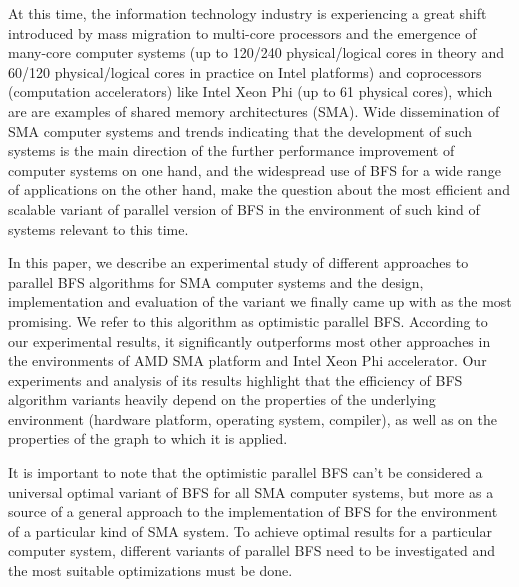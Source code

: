 \documentclass[letterpaper]{article}
\begin{document}
		At this time, the information technology industry is experiencing a great shift introduced by mass migration to multi-core processors and the emergence of many-core computer systems (up to 120/240 physical/logical cores in theory and 60/120 physical/logical cores in practice on Intel platforms) and coprocessors (computation accelerators) like Intel Xeon Phi (up to 61 physical cores), which are are examples of shared memory architectures (SMA).
		Wide dissemination of SMA computer systems and trends indicating that the development of such systems is the main direction of the further performance improvement of computer systems on one hand, and the widespread use of BFS for a wide range of applications on the other hand, make the question about the most efficient and scalable variant of parallel version of BFS in the environment of such kind of systems relevant to this time.
				
		In this paper, we describe an experimental study of different approaches to parallel BFS algorithms for SMA computer systems and the design, implementation and evaluation of the variant we finally came up with as the most promising.
		We refer to this algorithm as optimistic parallel BFS.
		According to our experimental results, it significantly outperforms most other approaches in the environments of AMD SMA platform and Intel Xeon Phi accelerator.
		Our experiments and analysis of its results highlight that the efficiency of BFS algorithm variants heavily depend on the properties of the underlying environment (hardware platform, operating system, compiler), as well as on the properties of the graph to which it is applied. 
		
		It is important to note that the optimistic parallel BFS can't be considered a universal optimal variant of BFS for all SMA computer systems, but more as a source of a general approach to the implementation of BFS for the environment of a particular kind of SMA system.
		To achieve optimal results for a particular computer system, different variants of parallel BFS need to be investigated and the most suitable optimizations must be done.
	
	
\end{document}
